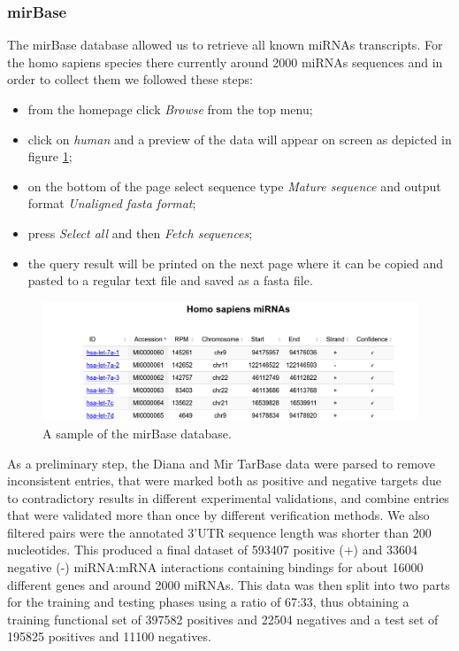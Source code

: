 \subsubsection{mirBase}
The mirBase database allowed us to retrieve all known miRNAs transcripts. For the homo sapiens species there currently around 2000 miRNAs sequences and in order to collect them we followed these steps:
\begin{itemize}
	\item from the homepage click \emph{Browse} from the top menu;
	\item click on \emph{human} and a preview of the data will appear on screen as depicted in figure \ref{fig:mirna_preview};
	\item on the bottom of the page select sequence type \emph{Mature sequence} and output format \emph{Unaligned fasta format};
	\item press \emph{Select all} and then \emph{Fetch sequences}; 
	\item the query result will be printed on the next page where it can be copied and pasted to a regular text file and saved as a fasta file.
\end{itemize}
 
\begin{figure}[hbt!]
	\centering
	\includegraphics[width=1\textwidth, height=0.3\textheight]{Figures/mirna_preview}
	\caption{A sample of the mirBase database.}
	\label{fig:mirna_preview}
\end{figure}

As a preliminary step, the Diana and Mir TarBase data were parsed to remove inconsistent entries, that were marked both as positive and negative targets due to contradictory results in different experimental validations, and combine entries that were validated more than once by different verification methods. We also filtered pairs were the annotated 3'UTR sequence length was shorter than 200 nucleotides.  This produced a final dataset of 593407 positive (+) and 33604 negative (-) miRNA:mRNA interactions containing bindings for about 16000 different genes and around 2000 miRNAs. This data was then split into two parts for the training and testing phases using a ratio of 67:33, thus obtaining a training functional set of 397582 positives and 22504 negatives and a test set of 195825 positives and 11100 negatives.

